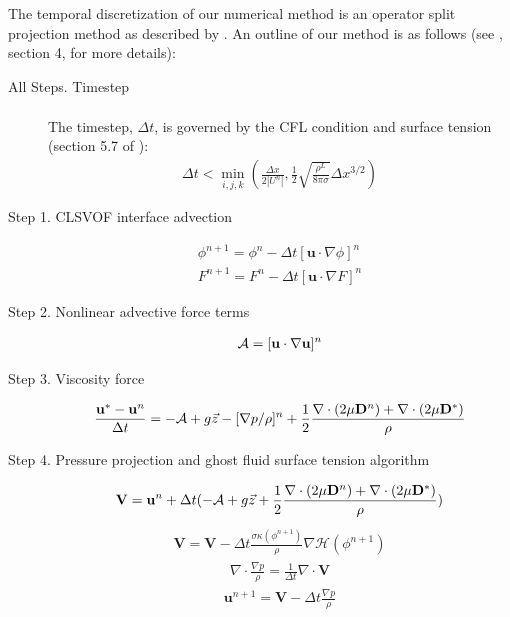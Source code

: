 \documentclass{elsarticle}
\newcommand{\Hea}{\mathcal{H}}
\newcommand{\vv}{\mathbf}
\newcommand{\bmV}{\vv{V}}
\newcommand{\bmD}{\vv{D}}
\newcommand{\bmu}{\vv{u}}
\begin{document}
The temporal discretization of our numerical method is an operator split
projection method as described by \citet{SusSmiHusOhtZhi07}.  An outline of 
our method is as follows (see \citet{SusSmiHusOhtZhi07}, section 4, for more 
details):
\begin{description}
\item[All Steps. Timestep] 
 \begin{eqnarray*}
 \end{eqnarray*}
  The timestep, $\Delta t$, is governed by the CFL condition and
  surface tension (section 5.7 of \citet{SusSmiHusOhtZhi07}):
 \begin{eqnarray*}
 \Delta t < \min_{i,j,k} \left( \frac{\Delta x}{2|U^{n}|},
   \frac{1}{2}\sqrt{\frac{\rho^{L}}{8\pi\sigma}}\Delta x^{3/2}\right)
 \end{eqnarray*}
  
\item[Step 1. CLSVOF interface advection]
 \begin{eqnarray*}
 \phi^{n+1}=\phi^{n}-\Delta t[\bmu\cdot\nabla\phi]^{n} \\
 F^{n+1}=F^{n}-\Delta t[\bmu\cdot\nabla F]^{n} 
 \end{eqnarray*}
\item[Step 2. Nonlinear advective force terms]
 \begin{eqnarray*}
 {\cal A}=[\bmu\cdot\nabla\bmu]^{n}
 \end{eqnarray*}
\item[Step 3. Viscosity force]
 \begin{eqnarray*}
 \frac{\bmu^{\ast}-\bmu^{n}}{\Delta t}=-{\cal A}+g\vec{z}-
  [\nabla p/\rho]^{n}+\frac{1}{2}\frac{
    \nabla\cdot(2\mu\bmD^{n})+ 
    \nabla\cdot(2\mu\bmD^{\ast})}{\rho}
 \end{eqnarray*}
\item[Step 4. Pressure projection and ghost fluid surface tension algorithm]
 \begin{eqnarray*}
 \bmV=\bmu^{n}+\Delta t(-{\cal A}+g\vec{z}+
   \frac{1}{2}\frac{
    \nabla\cdot(2\mu\bmD^{n})+ 
    \nabla\cdot(2\mu\bmD^{\ast})}{\rho})
 \end{eqnarray*}
 \begin{eqnarray*}
 \bmV=\bmV-
   \Delta t \frac{\sigma\kappa(\phi^{n+1})}{\rho}\nabla \Hea(\phi^{n+1}) 
 \end{eqnarray*}
 \begin{eqnarray*}
 \nabla\cdot\frac{\nabla p}{\rho}=\frac{1}{\Delta t}\nabla\cdot\bmV
 \end{eqnarray*}
 \begin{eqnarray*}
 \bmu^{n+1}=\bmV-\Delta t \frac{\nabla p}{\rho}
 \end{eqnarray*}
\end{description}
\end{document}
